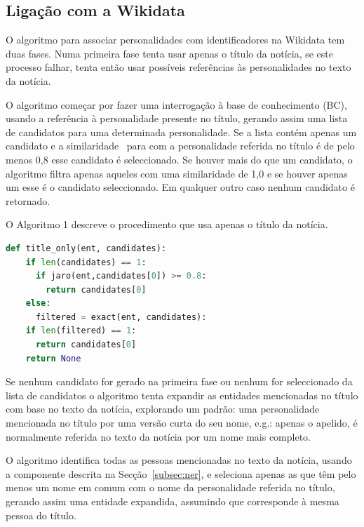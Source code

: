 \documentclass[a4paper, twocolumn, 11pt, twoside]{article}
\begin{document}
\subsection{Ligação com a Wikidata}
\label{subsec:ent_linking}

O algoritmo para associar personalidades com identificadores na Wikidata tem duas fases. Numa primeira fase tenta usar apenas o título da notícia, se este processo falhar, tenta então usar possíveis referências às personalidades no texto da notícia.

O algoritmo começar por fazer uma interrogação à base de conhecimento (BC), usando a referência à personalidade presente no título, gerando assim uma lista de candidatos para uma determinada personalidade. Se a lista contém apenas um candidato e a similaridade~\citep{jaro1989} para com a personalidade referida no título é de pelo menos 0,8 esse candidato é seleccionado. Se houver mais do que um candidato, o algoritmo filtra apenas aqueles com uma similaridade de 1,0 e se houver apenas um esse é o candidato seleccionado. Em qualquer outro caso nenhum candidato é retornado. 

O Algoritmo 1 descreve o procedimento que usa apenas o título da notícia.

\begin{lstlisting}[language=python,columns=fullflexible,frame=single,label={lst:alg1},title={Algoritmo 1. Ligação com a Wikidata usando apenas o título.},captionpos=b]
def title_only(ent, candidates):
    if len(candidates) == 1:
      if jaro(ent,candidates[0]) >= 0.8:
        return candidates[0]
    else:
      filtered = exact(ent, candidates):
	if len(filtered) == 1:
	  return candidates[0]
    return None
\end{lstlisting}

Se nenhum candidato for gerado na primeira fase ou nenhum for seleccionado da lista de candidatos o algoritmo tenta expandir as entidades mencionadas no título com base no texto da notícia, explorando um padrão: uma personalidade mencionada no título por uma versão curta do seu nome, e.g.: apenas o apelido, é normalmente referida no texto da notícia por um nome mais completo.

O algoritmo identifica todas as pessoas mencionadas no texto da notícia, usando a componente descrita na Secção~\ref{subsec:ner}, e seleciona apenas as que têm pelo menos um nome em comum com o nome da personalidade referida no título, gerando assim uma entidade expandida, assumindo que corresponde à mesma pessoa do título.
\end{document}
